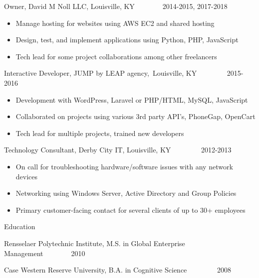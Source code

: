 {}

{Owner, }{David M Noll LLC}{, }{Louisville, KY~~~~~~~~2014-2015,
2017-2018}

\begin{itemize}
\tightlist
\item
  {Manage hosting for websites using AWS EC2 and shared hosting}
\item
  {Design, test, and implement applications using Python, PHP,
  JavaScript}
\item
  {Tech lead for some project collaborations among other freelancers}
\end{itemize}

{}

{Interactive Developer}{, }{JUMP by LEAP agency,}{~Louisville, KY
~~~~~~~~2015-2016}

\begin{itemize}
\tightlist
\item
  {Development with WordPress, Laravel or PHP/HTML, MySQL, JavaScript}
\item
  {Collaborated on projects using various 3rd party API's, PhoneGap,
  OpenCart }
\item
  {Tech lead for multiple projects, trained new developers}
\end{itemize}

{}

{Technology Consultant}{, }{Derby City IT}{, Louisville, KY
~~~~~~~~2012-2013}

\begin{itemize}
\tightlist
\item
  {On call for troubleshooting hardware/software issues with any network
  devices}
\item
  {Networking using Windows Server, Active Directory and Group Policies}
\item
  {Primary customer-facing contact for several clients of up to 30+
  employees}
\end{itemize}

{}

{}

{}

{Education }

{}

{Rensselaer Polytechnic Institute}{, M.S. in Global Enterprise
Management~~~~~~~~2010 }

{Case Western Reserve University}{, B.A. in Cognitive Science
~~~~~~~~2008}

{}
